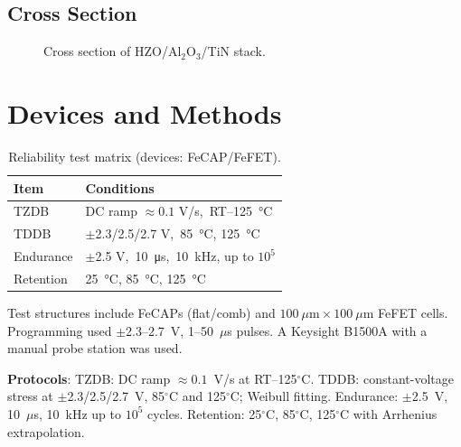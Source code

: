 \documentclass[conference]{IEEEtran}
\begin{document}
\subsection{Cross Section}
\begin{figure}[!htb]
  \centering
  \caption{Cross section of HZO/Al$_2$O$_3$/TiN stack.}
  \label{fig:stack}
\end{figure}

\FloatBarrier

\section{Devices and Methods}
\begin{table}[!htb]
  \centering
  \caption{Reliability test matrix (devices: FeCAP/FeFET).}
  \label{tab:test-matrix}
  \begin{tabular}{@{}ll@{}}
    \toprule
    \textbf{Item} & \textbf{Conditions} \\
    \midrule
    TZDB     & DC ramp $\approx 0.1$ V/s,\ RT--\SI{125}{\celsius} \\
    TDDB     & $\pm$2.3/2.5/2.7 V,\ \SI{85}{\celsius}, \SI{125}{\celsius} \\
    Endurance& $\pm$2.5 V,\ \SI{10}{\micro\second},\ \SI{10}{\kilo\hertz}, up to $10^5$ \\
    Retention& \SI{25}{\celsius}, \SI{85}{\celsius}, \SI{125}{\celsius} \\
    \bottomrule
  \end{tabular}
\end{table}

Test structures include FeCAPs (flat/comb) and $100~\mu\mathrm{m}\times100~\mu\mathrm{m}$ FeFET cells.
Programming used $\pm$2.3--2.7~V, 1--50~$\mu$s pulses.
A Keysight B1500A with a manual probe station was used.

\textbf{Protocols}: 
TZDB: DC ramp $\approx 0.1$~V/s at RT--125$^\circ$C.
TDDB: constant-voltage stress at $\pm$2.3/2.5/2.7~V, 85$^\circ$C and 125$^\circ$C; Weibull fitting.
Endurance: $\pm$2.5~V, 10~$\mu$s, 10~kHz up to $10^5$ cycles.
Retention: 25$^\circ$C, 85$^\circ$C, 125$^\circ$C with Arrhenius extrapolation.
\end{document}
